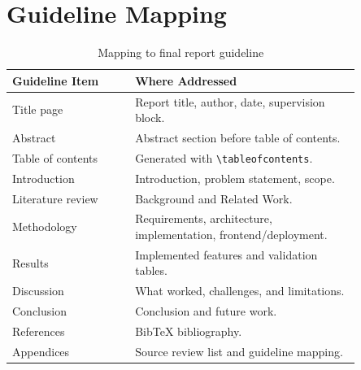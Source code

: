 \documentclass{article}
\begin{document}
\section{Guideline Mapping}

\begin{table}[h]
\centering
\begin{tabular}{p{0.30\linewidth} p{0.55\linewidth}}
\toprule
\textbf{Guideline Item} & \textbf{Where Addressed} \\
\midrule
Title page & Report title, author, date, supervision block. \\
Abstract & Abstract section before table of contents. \\
Table of contents & Generated with \texttt{\textbackslash tableofcontents}. \\
Introduction & Introduction, problem statement, scope. \\
Literature review & Background and Related Work. \\
Methodology & Requirements, architecture, implementation, frontend/deployment. \\
Results & Implemented features and validation tables. \\
Discussion & What worked, challenges, and limitations. \\
Conclusion & Conclusion and future work. \\
References & BibTeX bibliography. \\
Appendices & Source review list and guideline mapping. \\
\bottomrule
\end{tabular}
\caption{Mapping to final report guideline}
\end{table}



\end{document}

